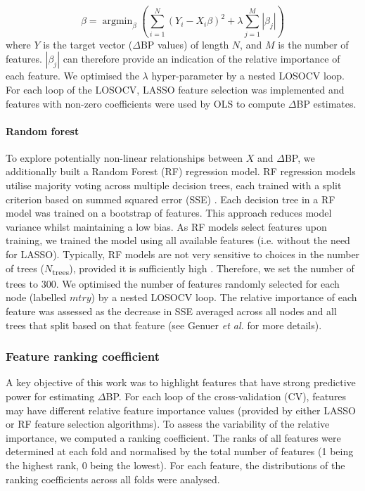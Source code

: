 \documentclass[fleqn,10pt]{wlscirep}
\DeclareMathOperator*{\argmin}{argmin} %
\begin{document}
\begin{equation}\label{eqn:LASSO}
\beta = \argmin_{\beta} (\sum_{i=1}^{N}(Y_i - X_i \beta)^2 + \lambda \sum_{j=1}^{M}|\beta_j|)
\end{equation}
where $Y$ is the target vector ($\Delta$BP values) of length $N$, and $M$ is the number of features. $|\beta_j|$ can therefore provide an indication of the relative importance of each feature. We optimised the $\lambda$ hyper-parameter by a nested LOSOCV loop. For each loop of the LOSOCV, LASSO feature selection was implemented and features with non-zero coefficients were used by OLS to compute $\Delta$BP estimates. 


\paragraph{Random forest}

To explore potentially non-linear relationships between $X$ and $\Delta$BP, we additionally built a Random Forest (RF) regression model. RF regression models utilise majority voting across multiple decision trees, each trained with a split criterion based on summed squared error (SSE) \cite{Genuer2008}. Each decision tree in a RF model was trained on a bootstrap of features. This approach reduces model variance whilst maintaining a low bias. As RF models select features upon training, we trained the model using all available features (i.e. without the need for LASSO). Typically, RF models are not very sensitive to choices in the number of trees ($N$\textsubscript{trees}), provided it is sufficiently high \cite{Genuer2008}. Therefore, we set the number of trees to 300. We optimised the number of features randomly selected for each node (labelled $mtry$) by a nested LOSOCV loop. The relative importance of each feature was assessed as the decrease in SSE averaged across all nodes and all trees that split based on that feature (see Genuer \textit{et al.} \cite{Genuer2008} for more details). 


\subsubsection{Feature ranking coefficient}

A key objective of this work was to highlight features that have strong predictive power for estimating $\Delta$BP. For each loop of the cross-validation (CV), features may have different relative feature importance values (provided by either LASSO or RF feature selection algorithms). To assess the variability of the relative importance, we computed a ranking coefficient. The ranks of all features were determined at each fold and normalised by the total number of features (1 being the highest rank, 0 being the lowest). For each feature, the distributions of the ranking coefficients across all folds were analysed.
\end{document}
